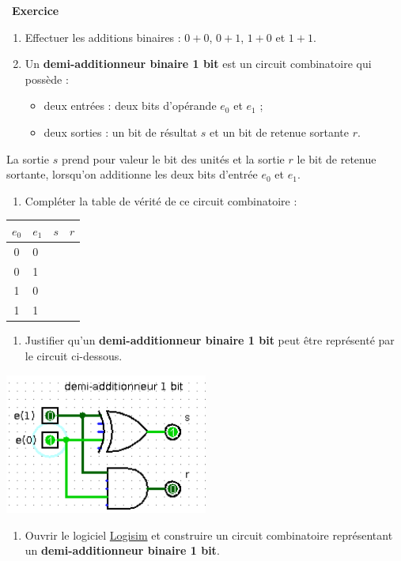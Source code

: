 \documentclass[
  11pt,
]{article}
\providecommand{\tightlist}{%
  \setlength{\itemsep}{0pt}\setlength{\parskip}{0pt}}
\newcounter{exo}
\newenvironment{exercice}[1]
{\par \medskip   \addtocounter{exo}{1} \noindent  
\begin{bclogo}[arrondi =0.1,   noborder = true, logo=\bccrayon, marge=4]{~\textbf{Exercice} \textbf{\theexo} {\itshape #1} }  \par}
{
\end{bclogo}
 \par \bigskip }
\newcounter{def}
\newcounter{logi}
\begin{document}
\begin{exercice}{}

\begin{enumerate}
\def\labelenumi{\arabic{enumi}.}
\item
  Effectuer les additions binaires : \(0+0\), \(0+1\), \(1+0\) et
  \(1+1\).
\item
  Un \textbf{demi-additionneur binaire 1 bit} est un circuit
  combinatoire qui possède :

  \begin{itemize}
  \tightlist
  \item
    deux entrées : deux bits d'opérande \(e_{0}\) et \(e_{1}\) ;
  \item
    deux sorties : un bit de résultat \(s\) et un bit de retenue
    sortante \(r\).
  \end{itemize}
\end{enumerate}

La sortie \(s\) prend pour valeur le bit des unités et la sortie \(r\)
le bit de retenue sortante, lorsqu'on additionne les deux bits d'entrée
\(e_{0}\) et \(e_{1}\).

\begin{enumerate}
\def\labelenumi{\arabic{enumi}.}
\tightlist
\item
  Compléter la table de vérité de ce circuit combinatoire :
\end{enumerate}

\begin{longtable}[]{@{}clll@{}}
\toprule
\(e_{0}\) & \(e_{1}\) & \(s\) & \(r\)\tabularnewline
\midrule
\endhead
0 & 0 & &\tabularnewline
0 & 1 & &\tabularnewline
1 & 0 & &\tabularnewline
1 & 1 & &\tabularnewline
\bottomrule
\end{longtable}

\begin{enumerate}
\def\labelenumi{\arabic{enumi}.}
\setcounter{enumi}{3}
\tightlist
\item
  Justifier qu'un \textbf{demi-additionneur binaire 1 bit} peut être
  représenté par le circuit ci-dessous.
\end{enumerate}

\includegraphics[width=0.5\textwidth,height=\textheight]{images/demi_additionneur.png}\\

\begin{enumerate}
\def\labelenumi{\arabic{enumi}.}
\setcounter{enumi}{4}
\tightlist
\item
  Ouvrir le logiciel \href{http://www.cburch.com/logisim/}{Logisim} et
  construire un circuit combinatoire représentant un
  \textbf{demi-additionneur binaire 1 bit}.
\end{enumerate}

\end{exercice}
\end{document}
